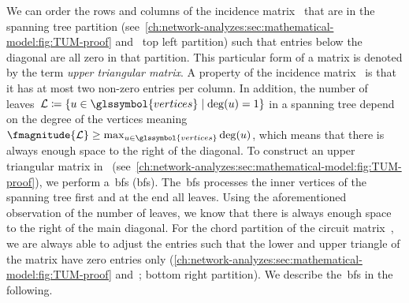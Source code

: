 We can order the rows and columns of the incidence
matrix~ that are in the spanning tree partition
(see~\cref{ch:network-analyzes:sec:mathematical-model:fig:TUM-proof}
and~ top left partition) such that entries below the diagonal are all
zero in that partition. This particular form of a matrix is denoted by the term
\emph{upper triangular matrix}. A property of the incidence
matrix~ is that it has at most two non-zero entries
per column. In addition, the number of leaves~$
    \mathcal{L}
    \coloneqq
    {\{
        \vertexa
        \in
        \glssymbol{vertices}
        \mid
        \degree(\vertexa) 
        = 
        1
    \}}
$ in a spanning tree depend on the degree of the vertices meaning~$
    \fmagnitude{\mathcal{L}} 
    \geq
    \max_{\vertexa\in\glssymbol{vertices}}
    \degree (\vertexa)
$, which means that there is always enough space to the right of the diagonal.
To construct an upper triangular matrix in~\constraintmatrix
(see~\cref{ch:network-analyzes:sec:mathematical-model:fig:TUM-proof}),
we perform a~\acrlong{bfs} (\gls{bfs}). The~\gls{bfs} processes the inner
vertices of the spanning tree first and at the end all leaves. Using the
aforementioned observation of the number of leaves, we know that there is always
enough space to the right of the main diagonal. For the chord partition of the
circuit matrix~, we are always able to adjust the entries
such that the lower and upper triangle of the matrix have zero entries only
(\cref{ch:network-analyzes:sec:mathematical-model:fig:TUM-proof}
and~; bottom right partition).
% 
We describe the~\gls{bfs} in the following.
 
